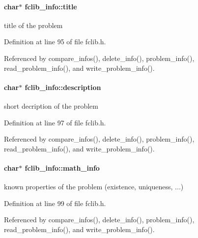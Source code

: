 \paragraph[{title}]{\setlength{\rightskip}{0pt plus 5cm}char$\ast$ fclib\+\_\+info\+::title}\label{structfclib__info_a4ea1b298e3aa7228a5f2a55f711f41d2}


title of the problem 



Definition at line 95 of file fclib.\+h.



Referenced by compare\+\_\+infos(), delete\+\_\+info(), problem\+\_\+info(), read\+\_\+problem\+\_\+info(), and write\+\_\+problem\+\_\+info().

\hypertarget{structfclib__info_a0c1680fee67eaf7b20c436a775d4f35d}{}
\paragraph[{description}]{\setlength{\rightskip}{0pt plus 5cm}char$\ast$ fclib\+\_\+info\+::description}\label{structfclib__info_a0c1680fee67eaf7b20c436a775d4f35d}


short decription of the problem 



Definition at line 97 of file fclib.\+h.



Referenced by compare\+\_\+infos(), delete\+\_\+info(), problem\+\_\+info(), read\+\_\+problem\+\_\+info(), and write\+\_\+problem\+\_\+info().

\hypertarget{structfclib__info_ad6dadb3af34a719e5ec3cab2d499c7f2}{}
\paragraph[{math\+\_\+info}]{\setlength{\rightskip}{0pt plus 5cm}char$\ast$ fclib\+\_\+info\+::math\+\_\+info}\label{structfclib__info_ad6dadb3af34a719e5ec3cab2d499c7f2}


known properties of the problem (existence, uniqueness, ...) 



Definition at line 99 of file fclib.\+h.



Referenced by compare\+\_\+infos(), delete\+\_\+info(), problem\+\_\+info(), read\+\_\+problem\+\_\+info(), and write\+\_\+problem\+\_\+info().

